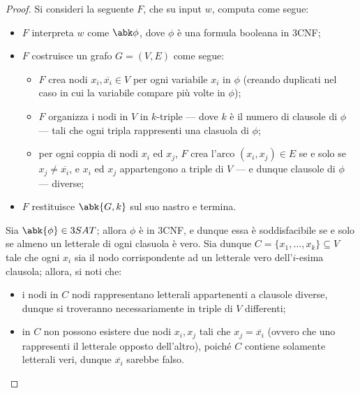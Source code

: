 \documentclass[a4paper, 12pt]{report}
\begin{document}
    \begin{proof}
        Si consideri la seguente \TM $F$, che su input $w$, computa come segue:

        \begin{itemize}
            \item $F$ interpreta $w$ come $\abk \phi$, dove $\phi$ è una formula booleana in 3CNF;
            \item $F$ costruisce un grafo $G = (V, E)$ come segue:

                \begin{itemize}
                    \item $F$ crea nodi $x_i, \overline{x_i} \in V$ per ogni variabile $x_i$ in $\phi$ (creando duplicati nel caso in cui la variabile compare più volte in $\phi$);
                    \item $F$ organizza i nodi in $V$ in $k$-triple --- dove $k$ è il numero di clausole di $\phi$ --- tali che ogni tripla rappresenti una clasuola di $\phi$;
                    \item per ogni coppia di nodi $x_i$ ed $x_j$, $F$ crea l'arco $(x_i, x_j) \in E$ se e solo se $x_j \neq \overline {x_i}$, e $x_i$ ed $x_j$ appartengono a triple di $V$ --- e dunque clausole di $\phi$ --- diverse;
                \end{itemize}

            \item $F$ restituisce $\abk{G, k}$ sul suo nastro e termina.
        \end{itemize}

        Sia $\abk{\phi} \in 3SAT$; allora $\phi$ è in 3CNF, e dunque essa è soddisfacibile se e solo se almeno un letterale di ogni clasuola è vero. Sia dunque $C = \{x_1, \ldots, x_k\} \subseteq V$ tale che ogni $x_i$ sia il nodo corrispondente ad un letterale vero dell'$i$-esima clausola; allora, si noti che:

        \begin{itemize}
            \item i nodi in $C$ nodi rappresentano letterali appartenenti a clausole diverse, dunque si troveranno necessariamente in triple di $V$ differenti;
            \item in $C$ non possono esistere due nodi $x_i, x_j$ tali che $x_j = \overline{x_i}$ (ovvero che uno rappresenti il letterale opposto dell'altro), poiché $C$ contiene solamente letterali veri, dunque $\overline{x_i}$ sarebbe falso.
        \end{itemize}


\end{proof}
\end{document}
